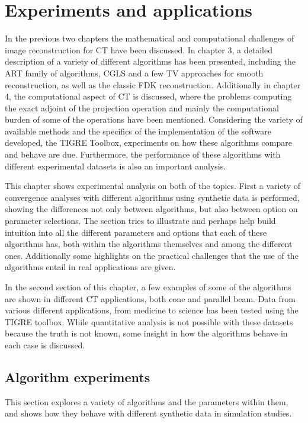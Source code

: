 \chapter{Experiments and applications}

In the previous two chapters the mathematical and computational challenges of image reconstruction for CT have been discussed. In chapter 3, a detailed description of a variety of different algorithms has been presented, including the ART family of algorithms, CGLS and a few TV approaches for smooth reconstruction, as well as the classic FDK reconstruction. Additionally in chapter 4, the computational aspect of CT is discussed, where the problems computing the exact adjoint of the projection operation and mainly the computational burden of some of the operations have been mentioned. Considering the variety of available methods and the specifics of the implementation of the software developed, the TIGRE Toolbox, experiments on how these algorithms compare and behave are due. Furthermore, the performance of these algorithms with different experimental datasets is also an important analysis.

This chapter shows experimental analysis on both of the topics. First a variety of convergence analyses with different algorithms using synthetic data is performed, showing the differences not only between algorithms, but also between option on parameter selections. The section tries to illustrate and perhaps help build intuition into all the different parameters and options that each of these algorithms has, both within the algorithms themselves and among the different ones. Additionally some highlights on the practical challenges that the use of the algorithms entail in real applications are given.

In the second section of this chapter, a few examples of some of the algorithms are shown in different CT applications, both cone and parallel beam. Data from various different applications, from medicine to science has been tested using the TIGRE toolbox. While quantitative analysis is not possible with these datasets because the truth is not known, some insight in how the algorithms behave in each case is discussed.

\section{Algorithm experiments}
This section explores a variety of algorithms and the parameters within them, and shows how they behave with different synthetic data in simulation studies. 

